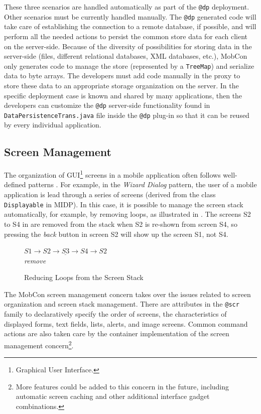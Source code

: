 These three scenarios are handled  automatically as part of the \texttt{@dp} deployment. Other scenarios must be currently handled manually. The \texttt{@dp} generated code will take care of establishing the connection to a remote database, if possible, and will perform all the needed actions to persist the common store data for each client on the server-side. Because of the diversity of possibilities for storing data in the server-side (files, different relational databases, XML databases, etc.), MobCon only generates code to manage the store (represented by a \texttt{Tree\-Map}) and serialize data to byte arrays. The developers must add code manually in the proxy to store these data to an appropriate storage organization on the server. In the specific deployment case is known and shared by many applications, then the developers can customize the \texttt{@dp} server-side functionality found in \texttt{Data\-Per\-sis\-ten\-ce\-Trans.ja\-va} file inside the \texttt{@dp} plug-in so that it can be reused by every individual application.

\subsection{Screen Management}
\label{sec.mobcon.hello}

The organization of GUI\footnote{Graphical User Interface.} screens in a mobile application often follows well-defined patterns \cite{www.j2me-ipatterns}. For example, in the \textit{Wizard Dialog} pattern, the user of a mobile application is lead through a series of screens (derived from the class \texttt{Displayable} in MIDP). In this case, it is possible to manage the screen stack automatically, for example, by removing loops, as illustrated in . The screens S2 to S4 in  are removed from the stack when S2 is re-shown from screen S4, so pressing the \textit{back} button in screen S2 will show up the screen S1, not S4.

\begin{figure}[ht]
	\begin{center}
$S1 \rightarrow \underline{S2 \rightarrow S3 \rightarrow S4} \rightarrow S2$\\
\textit{remove}
	\end{center}
	\caption{Reducing Loops from the Screen Stack}
	\label{fig:src.loops}
\end{figure}

The MobCon screen management concern takes over the issues related to screen organization and screen stack management. There are attributes in the \texttt{@scr} family to declaratively specify the order of screens, the characteristics of displayed forms, text fields, lists, alerts, and image screens. Common command actions are also taken care by the container implementation of the screen management concern\footnote{More features could be added to this concern in the future, including automatic screen caching and other additional interface gadget combinations.}.


